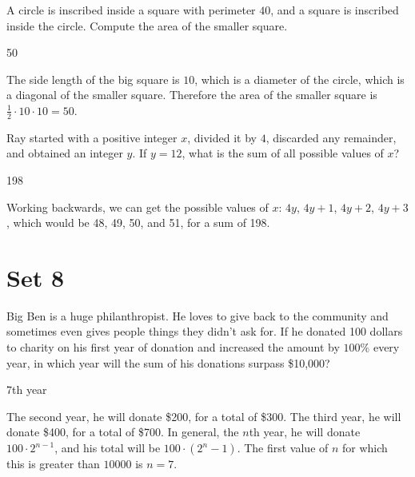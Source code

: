 \documentclass[11pt]{article}
\begin{document}
\begin{problem} 
A circle is inscribed inside a square with perimeter $40$, and a square is inscribed inside the circle. Compute the area of the smaller square. 
\end{problem}

\begin{answer}
50
\end{answer}

\begin{solution}
The side length of the big square is $10$, which is a diameter of the circle, which is a diagonal of the smaller square. Therefore the area of the smaller square is $\frac{1}{2} \cdot 10 \cdot 10 = 50$.
\end{solution}

\begin{problem} 
Ray started with a positive integer $x$, divided it by $4$, discarded any remainder, and obtained an integer $y$. If $y = 12$, what is the sum of all possible values of $x$?
\end{problem}

\begin{answer}
198
\end{answer}

\begin{solution}
Working backwards, we can get the possible values of $x$: $4y$, $4y+1$, $4y+2$, $4y+3$, which would be 48, 49, 50, and 51, for a sum of 198.
\end{solution}

\newpage

\section*{Set 8}

\begin{problem} 
Big Ben is a huge philanthropist. He loves to give back to the community and sometimes even gives people things they didn't ask for. If he donated 100 dollars to charity on his first year of donation and increased the amount by $100\%$ every year, in which year will the sum of his donations surpass \$10,000? 
\end{problem}

\begin{answer}
7th year
\end{answer}

\begin{solution}
The second year, he will donate \$200, for a total of \$300. The third year, he will donate \$400, for a total of \$700. In general, the $n$th year, he will donate $100 \cdot 2^{n-1}$, and his total will be $100 \cdot (2^{n} - 1)$. The first value of $n$ for which this is greater than $10000$ is $n = 7$.
\end{solution}
\end{document}
